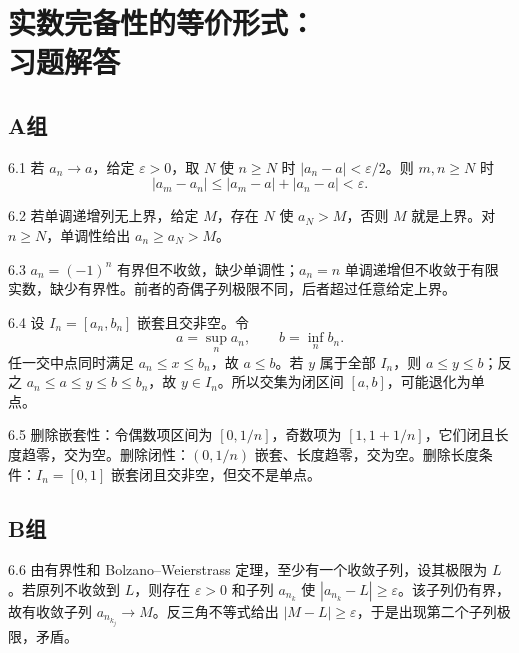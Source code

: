 \chapter[实数完备性的等价形式：习题解答]{实数完备性的等价形式：\\习题解答}

\section*{A组}

\begin{solution}{6.1}
若 \(a_n\to a\)，给定 \(\varepsilon>0\)，取 \(N\) 使 \(n\ge N\) 时 \(|a_n-a|<\varepsilon/2\)。则 \(m,n\ge N\) 时
\[
 |a_m-a_n|\le|a_m-a|+|a_n-a|<\varepsilon.
\]
\end{solution}

\begin{solution}{6.2}
若单调递增列无上界，给定 \(M\)，存在 \(N\) 使 \(a_N>M\)，否则 \(M\) 就是上界。对 \(n\ge N\)，单调性给出 \(a_n\ge a_N>M\)。
\end{solution}

\begin{solution}{6.3}
\(a_n=(-1)^n\) 有界但不收敛，缺少单调性；\(a_n=n\) 单调递增但不收敛于有限实数，缺少有界性。前者的奇偶子列极限不同，后者超过任意给定上界。
\end{solution}

\begin{solution}{6.4}
设 \(I_n=[a_n,b_n]\) 嵌套且交非空。令
\[
 a=\sup_n a_n,\qquad b=\inf_n b_n.
\]
任一交中点同时满足 \(a_n\le x\le b_n\)，故 \(a\le b\)。若 \(y\) 属于全部 \(I_n\)，则 \(a\le y\le b\)；反之 \(a_n\le a\le y\le b\le b_n\)，故 \(y\in I_n\)。所以交集为闭区间 \([a,b]\)，可能退化为单点。
\end{solution}

\begin{solution}{6.5}
删除嵌套性：令偶数项区间为 \([0,1/n]\)，奇数项为 \([1,1+1/n]\)，它们闭且长度趋零，交为空。删除闭性：\((0,1/n)\) 嵌套、长度趋零，交为空。删除长度条件：\(I_n=[0,1]\) 嵌套闭且交非空，但交不是单点。
\end{solution}

\section*{B组}

\begin{solution}{6.6}
由有界性和 Bolzano--Weierstrass 定理，至少有一个收敛子列，设其极限为 \(L\)。若原列不收敛到 \(L\)，则存在 \(\varepsilon>0\) 和子列 \(a_{n_k}\) 使 \(|a_{n_k}-L|\ge\varepsilon\)。该子列仍有界，故有收敛子列 \(a_{n_{k_j}}\to M\)。反三角不等式给出 \(|M-L|\ge\varepsilon\)，于是出现第二个子列极限，矛盾。
\end{solution}


